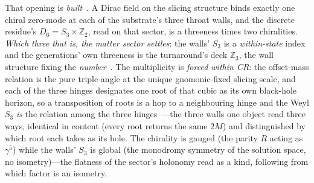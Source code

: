 \documentclass[11pt,a4paper]{article}
\theoremstyle{plain}
\theoremstyle{definition}
\theoremstyle{remark}
\begin{document}
\begin{enumerate}
That opening is \emph{built}~\cite{JanzenMatter}. A Dirac field on the slicing structure binds exactly one chiral zero-mode at each of the substrate's three throat walls, and the discrete residue's $D_6=S_3\times\mathbb{Z}_2$, read on that sector, is a threeness times two chiralities. \emph{Which three that is, the matter sector settles}: the walls' $S_3$ is a \emph{within-state} index and the generations' own threeness is the turnaround's deck $\mathbb{Z}_3$, the wall structure fixing the \emph{number}~\cite{JanzenMatter}. The multiplicity is \emph{forced within CR}: the offset-mass relation is the pure triple-angle at the unique gnomonic-fixed slicing scale, and each of the three hinges designates one root of that cubic as its own black-hole horizon, so a transposition of roots is a hop to a neighbouring hinge and the Weyl $S_3$ \emph{is} the relation among the three hinges~\cite{JanzenSlicing}---the three walls one object read three ways, identical in content (every root returns the same $2M$) and distinguished by which root each takes as its hole. The chirality is gauged (the parity $R$ acting as $\gamma^5$) while the walls' $S_3$ is global (the
monodromy symmetry of the solution space, no isometry)---the flatness of the sector's holonomy read as a kind, following from which factor is an isometry.


\end{enumerate}
\end{document}
